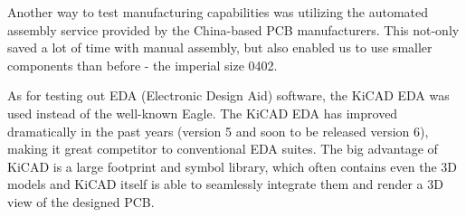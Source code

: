 Another way to test manufacturing capabilities was utilizing the automated assembly service provided by the China-based PCB manufacturers.
This not-only saved a lot of time with manual assembly, but also enabled us to use smaller components than before - the imperial size 0402.

As for testing out EDA (Electronic Design Aid) software, the KiCAD EDA was used instead of the well-known Eagle.
The KiCAD EDA has improved dramatically in the past years (version 5 and soon to be released version 6), making it great competitor to conventional EDA suites.
The big advantage of KiCAD is a large footprint and symbol library, which often contains even the 3D models and KiCAD itself is able to seamlessly integrate them and render a 3D view of the designed PCB.

